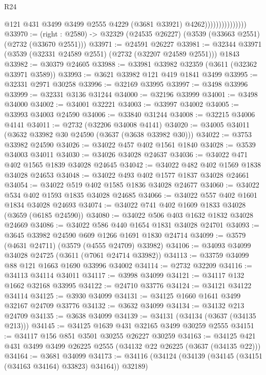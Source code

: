 \begin{lexlean}{R24}
\begin{coremodule}
                                  @121
                                  @431
                                  @3499
                                  @3499
                                  @2555
                                  @4229
                                  (@3681 @33921)
                                  @4262)))))))))))))))
@33970 := (right : @2580) -> @32329 (@24535 @26227) (@3539 (@33663 @2551) (@2732 (@33670 @2551)))
@33971 := @24591 @26227
@33981 := @32344 @33971 (@3539 (@32331 @24589 @2551) (@2732 (@32207 @24589 @2551))) @1843
@33982 := @30379 @24605
@33988 := @33981 @33982 @32359 (@3611 (@32362 @33971 @3589))
@33993 := @3621 @33982 @121 @419 @1841 @3499
@33995 := @32331 @2971 @30258
@33996 := @32169 @33995
@33997 := @3498 @33996
@33999 := @32331 @3136 @31244
@34000 := @32196 @33999
@34001 := @3498 @34000
@34002 := @34001 @32221
@34003 := @33997 @34002
@34005 := @33993 @34003 @24590
@34006 := @33840 @31244
@34008 := @32215 @34006 @4141
@34011 := @2732 (@32206 @34008 @4141)
@34020 := @34005 @34011 (@3632 @33982 @30 @24590 (@3637 (@3638 @33982 @30)))
@34022 := @3753 @33982 @24590
@34026 := @34022 @457 @402 @1561 @1840
@34028 := @3539 @34003 @34011
@34030 := @34026 @34028 @24637
@34036 := @34022 @471 @402 @1565 @1839 @34028 @24645
@34042 := @34022 @482 @402 @1569 @1838 @34028 @24653
@34048 := @34022 @493 @402 @1577 @1837 @34028 @24661
@34054 := @34022 @519 @402 @1585 @1836 @34028 @24677
@34060 := @34022 @534 @402 @1593 @1835 @34028 @24685
@34066 := @34022 @557 @402 @1601 @1834 @34028 @24693
@34074 := @34022 @741 @402 @1609 @1833 @34028 (@3659 (@6185 @24590))
@34080 := @34022 @506 @403 @1632 @1832 @34028 @24669
@34086 := @34022 @586 @440 @1654 @1831 @34028 @24701
@34093 := @3645 @33982 @24590 @609 @1266 @1691 @1830 @24714
@34099 := @3579 (@4631 @24711) (@3579 (@4555 @24709) @33982)
@34106 := @34093 @34099 @34028 @24725 (@3611 (@7061 @24714 @33982))
@34113 := @33759 @34099 @88 @121 @1663 @1690 @33996 @34002
@34114 := @2732 @32209
@34116 := @34113 @34114 @34011
@34117 := @3998 @34099
@34121 := @34117 @132 @1662 @32168 @33995
@34122 := @24710 @33776
@34124 := @34121 @34122 @34114
@34125 := @3930 @34099
@34131 := @34125 @1660 @1641 @3499 @32167 @24709 @33776
@34132 := @3632 @34099
@34134 := @34132 @213 @24709
@34135 := @3638 @34099
@34139 := @34131 (@34134 (@3637 (@34135 @213)))
@34145 := @34125 @1639 @431 @32165 @3499 @30259 @2555
@34151 := @34117 @156 @851 @3501 @30255 @26227 @30259
@34163 := @34125 @421 @431 @3499 @3499 @26225 @2555 (@34132 @22 @26225 (@3637 (@34135 @22)))
@34164 := @3681 @34099
@34173 := @34116 (@34124 (@34139 (@34145 (@34151 (@34163 @34164) @33823) @34164)) @32189)

\end{coremodule}
\end{lexlean}
